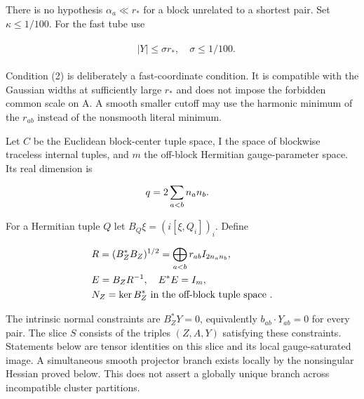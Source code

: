 There is no hypothesis \(\alpha _{a} \ll  r_{*}\) for a block unrelated
to a shortest pair. Set \(\kappa \le 1/100\). For the fast tube use

\begin{gather*}
\begin{aligned}
& \vert Y\vert  \le  \sigma  r_{*}, \quad  \sigma \le 1/100.
\end{aligned}\tag{2}
\end{gather*}

Condition (2) is deliberately a fast-coordinate condition. It is
compatible with the Gaussian widths at sufficiently large \(r_{*}\) and
does not impose the forbidden common scale on A. A smooth smaller cutoff
may use the harmonic minimum of the \(r_{ab}\) instead of the nonsmooth
literal minimum.

Let \(C\) be the Euclidean block-center tuple space, I the space of
blockwise traceless internal tuples, and \(m\) the off-block Hermitian
gauge-parameter space. Its real dimension is

\begin{gather*}
\begin{aligned}
& q=2 \sum _{a<b} n_{a} n_{b}.
\end{aligned}\notag
\end{gather*}

For a Hermitian tuple \(Q\) let \(B_{Q} \xi =(i[\xi ,Q_{i}])_{i}\).
Define

\begin{gather*}
\begin{aligned}
& R=(B_{Z}^{*} B_{Z})^{1/2}=\bigoplus _{a<b} r_{ab} I_{2n_{a} n_{b}}, \\
& E=B_{Z} R^{-1}, \quad  E^{*}E=I_{m}, \\
& N_{Z}=\ker  B_{Z}^{*} \text{ in the off-block tuple space }.
\end{aligned}\notag
\end{gather*}

The intrinsic normal constraints are \(B_{Z}^{*}Y=0\), equivalently
\(b_{ab} \cdot  Y_{ab}=0\) for every pair. The slice \(S\) consists of
the triples \((Z,A,Y)\) satisfying these constraints. Statements below
are tensor identities on this slice and its local gauge-saturated image.
A simultaneous smooth projector branch exists locally by the nonsingular
Hessian proved below. This does not assert a globally unique branch
across incompatible cluster partitions.

